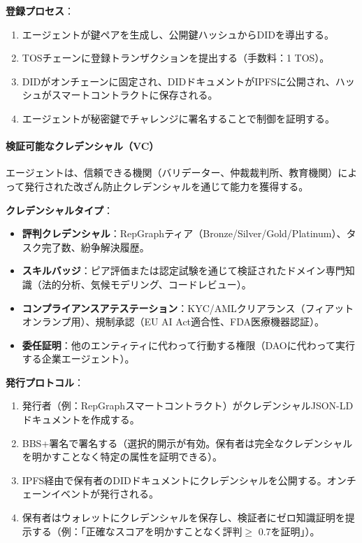 \documentclass[11pt]{article}
\begin{document}
\textbf{登録プロセス}：
\begin{enumerate}[noitemsep]
  \item エージェントが鍵ペアを生成し、公開鍵ハッシュからDIDを導出する。
  \item TOSチェーンに登録トランザクションを提出する（手数料：1 TOS）。
  \item DIDがオンチェーンに固定され、DIDドキュメントがIPFSに公開され、ハッシュがスマートコントラクトに保存される。
  \item エージェントが秘密鍵でチャレンジに署名することで制御を証明する。
\end{enumerate}

\paragraph{検証可能なクレデンシャル（VC）}
エージェントは、信頼できる機関（バリデーター、仲裁裁判所、教育機関）によって発行された改ざん防止クレデンシャルを通じて能力を獲得する。

\textbf{クレデンシャルタイプ}：
\begin{itemize}[noitemsep]
  \item \textbf{評判クレデンシャル}：RepGraphティア（Bronze/Silver/Gold/Platinum）、タスク完了数、紛争解決履歴。
  \item \textbf{スキルバッジ}：ピア評価または認定試験を通じて検証されたドメイン専門知識（法的分析、気候モデリング、コードレビュー）。
  \item \textbf{コンプライアンスアテステーション}：KYC/AMLクリアランス（フィアットオンランプ用）、規制承認（EU AI Act適合性、FDA医療機器認証）。
  \item \textbf{委任証明}：他のエンティティに代わって行動する権限（DAOに代わって実行する企業エージェント）。
\end{itemize}

\textbf{発行プロトコル}：
\begin{enumerate}[noitemsep]
  \item 発行者（例：RepGraphスマートコントラクト）がクレデンシャルJSON-LDドキュメントを作成する。
  \item BBS+署名で署名する（選択的開示が有効。保有者は完全なクレデンシャルを明かすことなく特定の属性を証明できる）。
  \item IPFS経由で保有者のDIDドキュメントにクレデンシャルを公開する。オンチェーンイベントが発行される。
  \item 保有者はウォレットにクレデンシャルを保存し、検証者にゼロ知識証明を提示する（例：「正確なスコアを明かすことなく評判$\geq$ 0.7を証明」）。
\end{enumerate}
\end{document}

